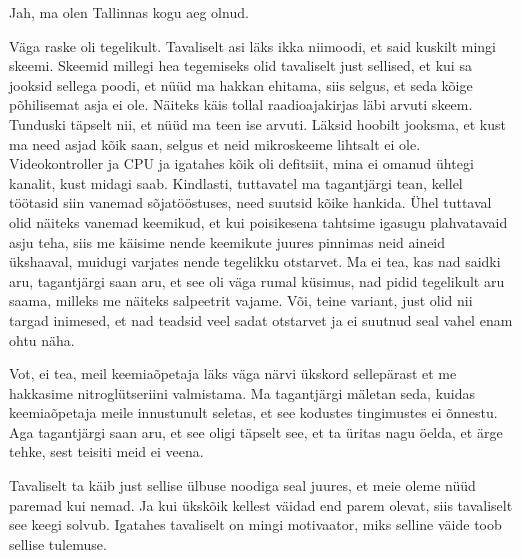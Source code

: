Jah, ma olen Tallinnas kogu aeg olnud. 


Väga raske oli tegelikult. Tavaliselt asi läks ikka niimoodi, et said kuskilt mingi skeemi. Skeemid millegi hea tegemiseks olid tavaliselt just sellised, et kui sa jooksid sellega poodi, et nüüd ma hakkan  ehitama, siis selgus, et seda kõige põhilisemat asja ei ole. Näiteks käis tollal raadioajakirjas läbi arvuti skeem. Tunduski täpselt nii, et  nüüd ma teen ise arvuti. Läksid hoobilt jooksma, et kust ma need asjad kõik saan, selgus et neid mikroskeeme lihtsalt ei ole. Videokontroller ja CPU ja igatahes kõik oli defitsiit, mina ei omanud ühtegi kanalit, kust midagi saab. Kindlasti, tuttavatel ma tagantjärgi tean, kellel töötasid siin vanemad sõjatööstuses, need suutsid kõike hankida. Ühel tuttaval olid näiteks vanemad keemikud, et kui poisikesena tahtsime igasugu plahvatavaid asju teha, siis me käisime nende keemikute juures pinnimas neid aineid ükshaaval, muidugi varjates nende tegelikku otstarvet. Ma ei tea, kas nad saidki aru, tagantjärgi saan aru, et see oli väga rumal küsimus, nad pidid tegelikult aru saama, milleks me  näiteks salpeetrit vajame. Või, teine variant,  just olid nii targad inimesed, et nad teadsid veel sadat otstarvet ja ei suutnud seal vahel enam ohtu näha. 


Vot, ei tea, meil keemiaõpetaja läks väga närvi ükskord sellepärast et me hakkasime nitroglütseriini valmistama. Ma tagantjärgi mäletan seda, kuidas keemiaõpetaja meile innustunult seletas, et see kodustes tingimustes ei õnnestu. Aga tagantjärgi saan aru, et see oligi täpselt see, et ta üritas nagu öelda, et ärge tehke, sest teisiti meid ei veena. 


Tavaliselt ta käib just sellise ülbuse noodiga seal juures, et meie oleme nüüd paremad kui nemad. Ja kui ükskõik kellest väidad end parem olevat, siis tavaliselt see keegi solvub. Igatahes tavaliselt on mingi motivaator, miks selline väide toob sellise tulemuse. 

